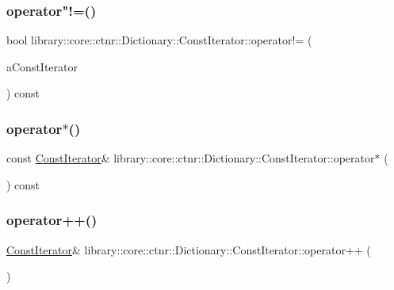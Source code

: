 \subsubsection{\texorpdfstring{operator"!=()}{operator!=()}}
{\footnotesize\ttfamily bool library\+::core\+::ctnr\+::\+Dictionary\+::\+Const\+Iterator\+::operator!= (\begin{DoxyParamCaption}\item[{const \hyperlink{classlibrary_1_1core_1_1ctnr_1_1_dictionary_1_1_const_iterator}{Const\+Iterator} \&}]{a\+Const\+Iterator }\end{DoxyParamCaption}) const}

\mbox{\label{classlibrary_1_1core_1_1ctnr_1_1_dictionary_1_1_const_iterator_adb1c1a55c8f9dba41f2ab3061e69dee2}} 
\subsubsection{\texorpdfstring{operator$\ast$()}{operator*()}}
{\footnotesize\ttfamily const \hyperlink{classlibrary_1_1core_1_1ctnr_1_1_dictionary_1_1_const_iterator}{Const\+Iterator}\& library\+::core\+::ctnr\+::\+Dictionary\+::\+Const\+Iterator\+::operator$\ast$ (\begin{DoxyParamCaption}{ }\end{DoxyParamCaption}) const}

\mbox{\label{classlibrary_1_1core_1_1ctnr_1_1_dictionary_1_1_const_iterator_a7a8907d90b0014ef1645028ef8edeff3}} 
\subsubsection{\texorpdfstring{operator++()}{operator++()}\hspace{0.1cm}{\footnotesize\ttfamily [1/2]}}
{\footnotesize\ttfamily \hyperlink{classlibrary_1_1core_1_1ctnr_1_1_dictionary_1_1_const_iterator}{Const\+Iterator}\& library\+::core\+::ctnr\+::\+Dictionary\+::\+Const\+Iterator\+::operator++ (\begin{DoxyParamCaption}{ }\end{DoxyParamCaption})}

